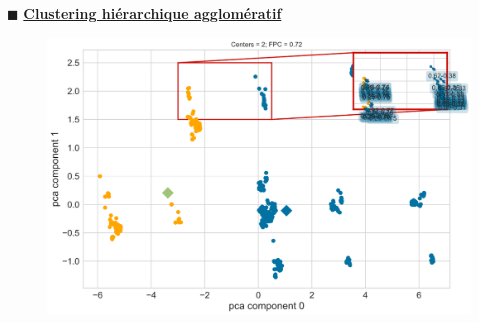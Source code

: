 \documentclass[aspectratio=169,professionalfonts, 12pt]{beamer}
\begin{document}
\begin{frame}
  \(\displaystyle \blacksquare \) \textbf{\underline{Clustering hiérarchique agglomératif}} \\
  \justifying
  \begin{minipage}{\textwidth}
    \begin{figure}[H]
      \centering
      \qquad
    \end{figure}
  \end{minipage}
\end{frame}

\begin{frame}
  \justifying
  \begin{minipage}{\textwidth}
    \begin{figure}[H]
      \begin{center}
        \includegraphics[scale=0.4]{images/contribution/fuzzy_partition_plot1.png}
      \end{center}
    \end{figure}
  \end{minipage}
\end{frame}
\end{document}
